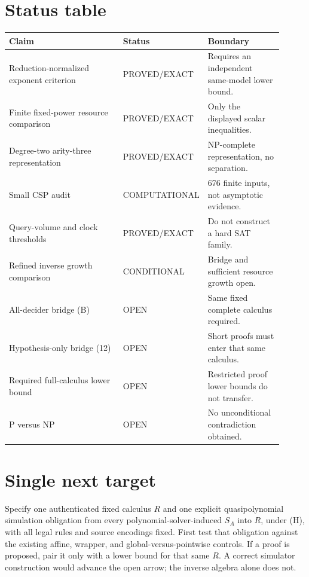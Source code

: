\documentclass[11pt]{article}
\begin{document}
\section*{Status table}
\begin{longtable}{p{0.44\linewidth}p{0.18\linewidth}p{0.29\linewidth}}
\toprule
Claim & Status & Boundary\\
\midrule
Reduction-normalized exponent criterion & PROVED/EXACT &
Requires an independent same-model lower bound.\\
Finite fixed-power resource comparison & PROVED/EXACT &
Only the displayed scalar inequalities.\\
Degree-two arity-three representation & PROVED/EXACT &
NP-complete representation, no separation.\\
Small CSP audit & COMPUTATIONAL &
676 finite inputs, not asymptotic evidence.\\
Query-volume and clock thresholds & PROVED/EXACT &
Do not construct a hard SAT family.\\
Refined inverse growth comparison & CONDITIONAL &
Bridge and sufficient resource growth open.\\
All-decider bridge (B) & OPEN &
Same fixed complete calculus required.\\
Hypothesis-only bridge (12) & OPEN &
Short proofs must enter that same calculus.\\
Required full-calculus lower bound & OPEN &
Restricted proof lower bounds do not transfer.\\
P versus NP & OPEN &
No unconditional contradiction obtained.\\
\bottomrule
\end{longtable}

\section*{Single next target}
Specify one authenticated fixed calculus $R$ and one explicit
quasipolynomial simulation obligation from every polynomial-solver-induced
$S_A$ into $R$, under (H), with all legal rules and source encodings fixed.
First test that obligation against the existing affine, wrapper, and
global-versus-pointwise controls. If a proof is proposed, pair it only with
a lower bound for that same $R$. A correct simulator construction would
advance the open arrow; the inverse algebra alone does not.



\end{document}
